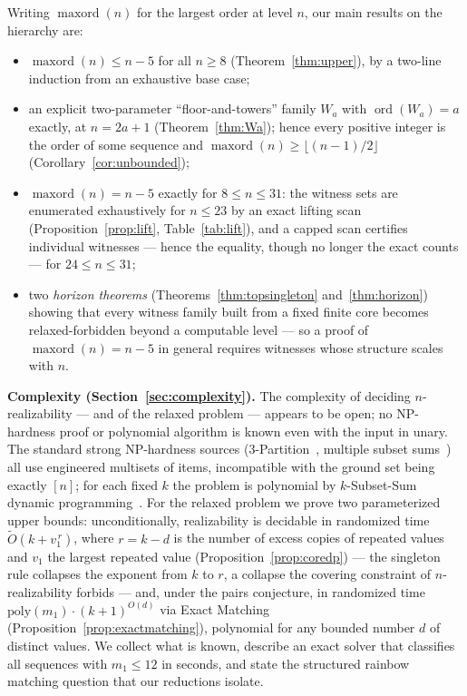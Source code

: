 \documentclass[11pt]{article}
\theoremstyle{definition}
\theoremstyle{remark}
\newcommand{\ord}{\operatorname{ord}}
\newcommand{\maxord}{\operatorname{maxord}}
\newcommand{\intv}[1]{[#1]}
\newcommand{\Otilde}{\widetilde{O}}
\begin{document}
Writing $\maxord(n)$ for the largest order at level $n$, our main results on the
hierarchy are:
\begin{itemize}[itemsep=1pt]
\item $\maxord(n)\le n-5$ for all $n\ge8$ (Theorem~\ref{thm:upper}), by a two-line
induction from an exhaustive base case;
\item an explicit two-parameter ``floor-and-towers'' family $W_a$ with
$\ord(W_a)=a$ exactly, at $n=2a+1$ (Theorem~\ref{thm:Wa}); hence every positive
integer is the order of some sequence and
$\maxord(n)\ge\lfloor(n-1)/2\rfloor$ (Corollary~\ref{cor:unbounded});
\item $\maxord(n)=n-5$ exactly for $8\le n\le31$: the witness sets are enumerated
exhaustively for $n\le23$ by an exact lifting scan (Proposition~\ref{prop:lift},
Table~\ref{tab:lift}), and a capped scan certifies individual witnesses --- hence the
equality, though no longer the exact counts --- for $24\le n\le31$;
\item two \emph{horizon theorems} (Theorems~\ref{thm:topsingleton}
and~\ref{thm:horizon}) showing that every witness family built from a fixed finite
core becomes relaxed-forbidden beyond a computable level --- so a proof of
$\maxord(n)=n-5$ in general requires witnesses whose structure scales with $n$.
\end{itemize}

\textbf{Complexity (Section~\ref{sec:complexity}).}
The complexity of deciding $n$-realizability --- and of the relaxed problem --- appears
to be open; no NP-hardness proof or polynomial algorithm is known even with the input
in unary. The standard strong NP-hardness sources (3-Partition~\cite{GareyJohnson79},
multiple subset sums~\cite{CapraraKP00,CieliebakEPS08}) all use engineered multisets
of items, incompatible with the ground set being exactly $\intv{n}$; for each fixed
$k$ the problem is polynomial by $k$-Subset-Sum dynamic
programming~\cite{AntonopoulosPPV23}. For the relaxed problem we prove two
parameterized upper bounds: unconditionally, realizability is decidable in
randomized time $\Otilde(k+v_1^{\,r})$, where $r=k-d$ is the number of excess
copies of repeated values and $v_1$ the largest repeated value
(Proposition~\ref{prop:coredp}) --- the singleton rule collapses the exponent from
$k$ to $r$, a collapse the covering constraint of $n$-realizability forbids ---
and, under the pairs conjecture, in randomized time
$\mathrm{poly}(m_1)\cdot(k+1)^{O(d)}$ via Exact Matching
(Proposition~\ref{prop:exactmatching}), polynomial for any bounded number $d$ of
distinct values. We collect what is known, describe an exact
solver that classifies all sequences with $m_1\le12$ in seconds, and state the
structured rainbow matching question that our reductions isolate.
\end{document}
